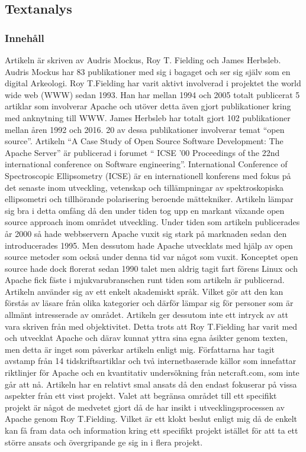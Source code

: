 \documentclass[a4paper]{article}
\begin{document}
\subsection{Textanalys}
\subsubsection{Innehåll}
Artikeln är skriven av Audris Mockus, Roy T. Fielding och James Herbsleb. Audris Mockus har 83 publikationer med sig i bagaget och ser sig själv som en digital Arkeologi. Roy T.Fielding har varit aktivt involverad i projektet the world wide web (WWW) sedan 1993. Han har mellan 1994 och 2005 totalt publicerat 5 artiklar som involverar Apache och utöver detta även gjort publikationer kring med anknytning till WWW. James Herbsleb har totalt gjort 102 publikationer mellan åren 1992 och 2016. 20 av dessa publikationer involverar temat “open source”. 
Artikeln “A Case Study of Open Source Software Development: The Apache Server” är publicerad i forumet “ ICSE '00 Proceedings of the 22nd international conference on Software engineering”. International Conference of Spectroscopic Ellipsometry (ICSE) 
är en internationell konferens med fokus på det senaste inom utveckling, vetenskap och tillämpningar av spektroskopiska ellipsometri och tillhörande polarisering beroende mättekniker. Artikeln lämpar sig bra i detta omfång då den under tiden tog upp en markant växande open source approach inom området utveckling.
Under tiden som artikeln publicerades år 2000 så hade webbservern Apache vuxit sig stark på marknaden sedan den introducerades 1995. Men dessutom hade Apache utvecklats med hjälp av open source metoder som också under denna tid var något som vuxit. Konceptet open source hade dock florerat sedan 1990 talet men aldrig tagit fart förens Linux och Apache fick fäste i mjukvarubranschen runt tiden som artikeln är publicerad. Artikeln använder sig av ett enkelt akademiskt språk. Vilket gör att den kan förstås av läsare från olika kategorier och därför lämpar sig för personer som är allmänt intresserade av området. Artikeln ger dessutom  inte ett intryck av att vara skriven från med objektivitet. Detta trots att Roy T.Fielding har varit med och utvecklat Apache och därav kunnat yttra sina egna åsikter genom texten, men detta är inget som påverkar artikeln enligt mig.
Författarna har tagit avstamp från 14 tidskriftsartiklar och två internetbaserade källor som innefattar riktlinjer för Apache och en kvantitativ undersökning från netcraft.com, som inte går att nå. Artikeln har en relativt smal ansats då den endast fokuserar på vissa aspekter från ett visst projekt. Valet att begränsa området till ett specifikt projekt är något de medvetet gjort då de har insikt i utvecklingsprocessen av Apache genom Roy T.Fielding. Vilket är ett klokt beslut enligt mig då de enkelt kan få fram data och information kring ett specifikt projekt istället för att ta ett större ansats och övergripande ge sig in i flera projekt.
\end{document}
